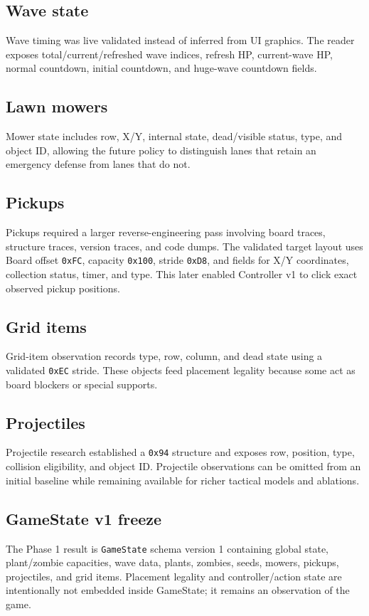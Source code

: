 \documentclass[11pt,a4paper]{article}
\begin{document}
\subsection{Wave state}
Wave timing was live validated instead of inferred from UI graphics. The reader exposes total/current/refreshed wave indices, refresh HP, current-wave HP, normal countdown, initial countdown, and huge-wave countdown fields.
\subsection{Lawn mowers}
Mower state includes row, X/Y, internal state, dead/visible status, type, and object ID, allowing the future policy to distinguish lanes that retain an emergency defense from lanes that do not.
\subsection{Pickups}
Pickups required a larger reverse-engineering pass involving board traces, structure traces, version traces, and code dumps. The validated target layout uses Board offset \texttt{0xFC}, capacity \texttt{0x100}, stride \texttt{0xD8}, and fields for X/Y coordinates, collection status, timer, and type. This later enabled Controller v1 to click exact observed pickup positions.
\subsection{Grid items}
Grid-item observation records type, row, column, and dead state using a validated \texttt{0xEC} stride. These objects feed placement legality because some act as board blockers or special supports.
\subsection{Projectiles}
Projectile research established a \texttt{0x94} structure and exposes row, position, type, collision eligibility, and object ID. Projectile observations can be omitted from an initial baseline while remaining available for richer tactical models and ablations.
\subsection{GameState v1 freeze}
The Phase 1 result is \texttt{GameState} schema version 1 containing global state, plant/zombie capacities, wave data, plants, zombies, seeds, mowers, pickups, projectiles, and grid items. Placement legality and controller/action state are intentionally not embedded inside GameState; it remains an observation of the game.
\end{document}
